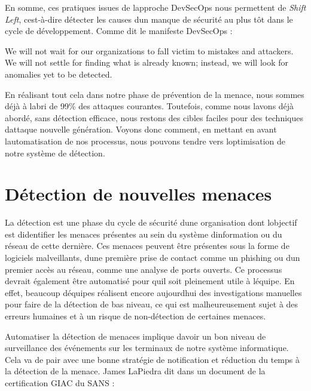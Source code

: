 \documentclass[
  11pt,
  a4paper,
  krantz2,
  11pt,
  oneside]{krantz}
\renewenvironment{quote}{\begin{VF}}{\end{VF}}
\begin{document}
En somme, ces pratiques issues de l\textquotesingle approche DevSecOps nous permettent de \emph{Shift Left}, c\textquotesingle est-à-dire détecter les causes d\textquotesingle un manque de sécurité au plus tôt dans le cycle de développement. Comme dit le manifeste DevSecOps :

\begin{quote}
We will not wait for our organizations to fall victim to mistakes and attackers. We will not settle for finding what is already known; instead, we will look for anomalies yet to be detected.
\end{quote}

En réalisant tout cela dans notre phase de prévention de la menace, nous sommes déjà à l\textquotesingle abri de 99\% des attaques courantes. Toutefois, comme nous l\textquotesingle avons déjà abordé, sans détection efficace, nous restons des cibles faciles pour des techniques d\textquotesingle attaque nouvelle génération. Voyons donc comment, en mettant en avant l\textquotesingle automatisation de nos processus, nous pouvons tendre vers l\textquotesingle optimisation de notre système de détection.

\section{Détection de nouvelles menaces}\label{duxe9tection-de-nouvelles-menaces}

La détection est une phase du cycle de sécurité d\textquotesingle une organisation dont l\textquotesingle objectif est d\textquotesingle identifier les menaces présentes au sein du système d\textquotesingle information ou du réseau de cette dernière. Ces menaces peuvent être présentes sous la forme de logiciels malveillants, d\textquotesingle une première prise de contact comme un phishing ou d\textquotesingle un premier accès au réseau, comme une analyse de ports ouverts. Ce processus devrait également être automatisé pour qu\textquotesingle il soit pleinement utile à l\textquotesingle équipe. En effet, beaucoup d\textquotesingle équipes réalisent encore aujourd\textquotesingle hui des investigations manuelles pour faire de la détection de bas niveau, ce qui est malheureusement sujet à des erreurs humaines et à un risque de non-détection de certaines menaces.

Automatiser la détection de menaces implique d\textquotesingle avoir un bon niveau de surveillance des événements sur les terminaux de notre système informatique. Cela va de pair avec une bonne stratégie de notification et réduction du temps à la détection de la menace. James LaPiedra dit dans un document de la certification GIAC du SANS :
\end{document}
